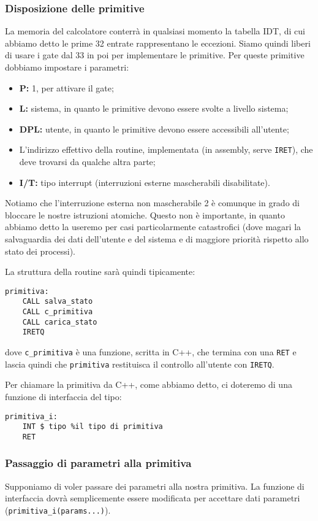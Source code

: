 \documentclass[a4paper,11pt]{article}
\begin{document}
\subsubsection{Disposizione delle primitive}
La memoria del calcolatore conterrà in qualsiasi momento la tabella IDT, di cui abbiamo detto le prime 32 entrate rappresentano le eccezioni.
Siamo quindi liberi di usare i gate dal 33 in poi per implementare le primitive.
Per queste primitive dobbiamo impostare i parametri:
\begin{itemize}
	\item \textbf{P:} 1, per attivare il gate;
	\item \textbf{L:} sistema, in quanto le primitive devono essere svolte a livello sistema;
	\item \textbf{DPL:} utente, in quanto le primitive devono essere accessibili all'utente;
	\item L'indirizzo effettivo della routine, implementata (in assembly, serve \lstinline|IRET|), che deve trovarsi da qualche altra parte;
	\item \textbf{I/T:} tipo interrupt (interruzioni esterne mascherabili disabilitate).
\end{itemize}

Notiamo che l'interruzione esterna non mascherabile 2 è comunque in grado di bloccare le nostre istruzioni atomiche.
Questo non è importante, in quanto abbiamo detto la useremo per casi particolarmente catastrofici (dove magari la salvaguardia dei dati dell'utente e del sistema e di maggiore priorità rispetto allo stato dei processi).

La struttura della routine sarà quindi tipicamente:
\begin{lstlisting}[language=assembler, style=codestyle]	
primitiva:
	CALL salva_stato
	CALL c_primitiva
	CALL carica_stato
	IRETQ
\end{lstlisting}

dove \lstinline|c_primitiva| è una funzione, scritta in C++, che termina con una \lstinline|RET| e lascia quindi che \lstinline|primitiva| restituisca il controllo all'utente con \lstinline|IRETQ|.

Per chiamare la primitiva da C++, come abbiamo detto, ci doteremo di una funzione di interfaccia del tipo:
\begin{lstlisting}[language=assembler, style=codestyle]	
primitiva_i:
	INT $ tipo %il tipo di primitiva 
	RET
\end{lstlisting}

\subsubsection{Passaggio di parametri alla primitiva}
Supponiamo di voler passare dei parametri alla nostra primitiva.
La funzione di interfaccia dovrà semplicemente essere modificata per accettare dati parametri (\lstinline|primitiva_i(params...)|).
\end{document}
